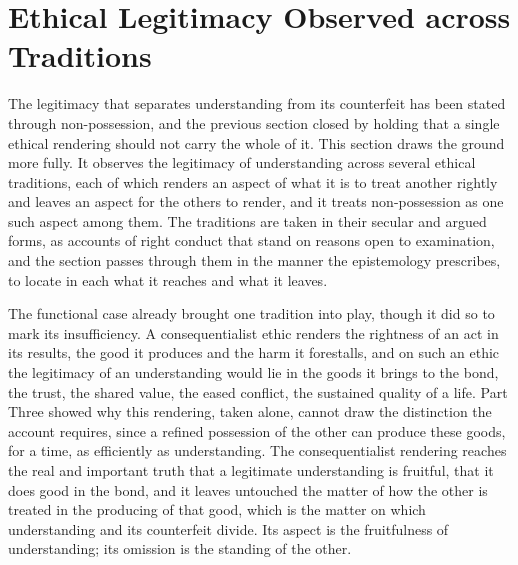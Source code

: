 \section{Ethical Legitimacy Observed across Traditions}
\label{p27:sec:traditions}

\noindent
The legitimacy that separates understanding from its counterfeit has been stated through non-possession, and the previous section closed by holding that a single ethical rendering should not carry the whole of it. This section draws the ground more fully. It observes the legitimacy of understanding across several ethical traditions, each of which renders an aspect of what it is to treat another rightly and leaves an aspect for the others to render, and it treats non-possession as one such aspect among them. The traditions are taken in their secular and argued forms, as accounts of right conduct that stand on reasons open to examination, and the section passes through them in the manner the epistemology prescribes, to locate in each what it reaches and what it leaves.

The functional case already brought one tradition into play, though it did so to mark its insufficiency. A consequentialist ethic renders the rightness of an act in its results, the good it produces and the harm it forestalls, and on such an ethic the legitimacy of an understanding would lie in the goods it brings to the bond, the trust, the shared value, the eased conflict, the sustained quality of a life. Part Three showed why this rendering, taken alone, cannot draw the distinction the account requires, since a refined possession of the other can produce these goods, for a time, as efficiently as understanding. The consequentialist rendering reaches the real and important truth that a legitimate understanding is fruitful, that it does good in the bond, and it leaves untouched the matter of how the other is treated in the producing of that good, which is the matter on which understanding and its counterfeit divide. Its aspect is the fruitfulness of understanding; its omission is the standing of the other.

